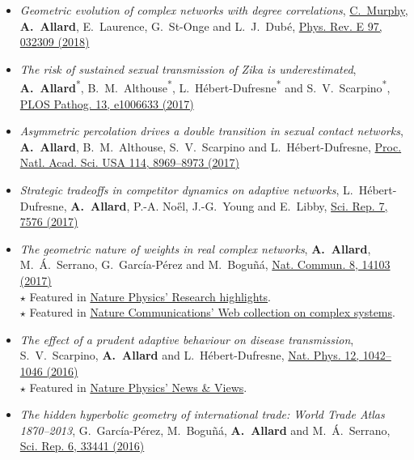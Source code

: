 \documentclass[11pt]{article}
\begin{document}
\begin{itemize}[itemsep=0.5em]
%
  \item \textit{Geometric evolution of complex networks with degree correlations}, \uline{C.~Murphy}, \textbf{A.~Allard}, E.~Laurence, G.~St-Onge and L.~J.~Dub\'e, \href{http://doi.org/10.1103/PhysRevE.97.032309}{Phys. Rev. E 97, 032309 (2018)}
%
  \item \textit{The risk of sustained sexual transmission of Zika is underestimated}, \textbf{A.~Allard}\textsuperscript{*}, B.~M.~Althouse\textsuperscript{*}, L.~H\'ebert-Dufresne\textsuperscript{*} and S.~V.~Scarpino\textsuperscript{*}, \href{http://dx.doi.org/10.1371/journal.ppat.1006633}{PLOS Pathog. 13, e1006633 (2017)}
%
  \item \textit{Asymmetric percolation drives a double transition in sexual contact networks}, \textbf{A.~Allard}, B.~M.~Althouse, S.~V.~Scarpino and L.~H\'ebert-Dufresne, \href{http://dx.doi.org/10.1073/pnas.1703073114}{Proc. Natl. Acad. Sci. USA 114, 8969--8973 (2017)}
%
  \item \textit{Strategic tradeoffs in competitor dynamics on adaptive networks}, L.~H\'ebert-Dufresne, \textbf{A.~Allard}, P.-A. No\H{e}l, J.-G.~Young and E.~Libby, \href{http://dx.doi.org/10.1038/s41598-017-07621-x}{Sci. Rep. 7, 7576 (2017)}
%
  \item \textit{The geometric nature of weights in real complex networks}, \textbf{A.~Allard}, M.~\'A.~Serrano, G.~Garc\'ia-P\'erez and M.~Bogu\~n\'a, \href{http://doi.org/10.1038/ncomms14103}{Nat. Commun. 8, 14103 (2017)}\\
  {\footnotesize $\star$ Featured in \href{http://dx.doi.org/10.1038/nphys4046}{Nature Physics' Research highlights}.}\\
  {\footnotesize $\star$ Featured in \href{https://www.nature.com/collections/ycjylwzvmz/}{Nature Communications' Web collection on complex systems}.}
%
  \item \textit{The effect of a prudent adaptive behaviour on disease transmission}, S.~V.~Scarpino, \textbf{A.~Allard} and L.~H\'ebert-Dufresne, \href{http://dx.doi.org/10.1038/nphys3832}{Nat. Phys. 12, 1042--1046 (2016)}\\
  {\footnotesize $\star$ Featured in \href{http://dx.doi.org/10.1038/nphys3939}{Nature Physics' News \& Views}.}%
%
  \item \textit{The hidden hyperbolic geometry of international trade: World Trade Atlas 1870--2013}, G.~Garc\'ia-P\'erez, M.~Bogu\~n\'a, \textbf{A.~Allard} and M.~\'A.~Serrano, \href{http://dx.doi.org/10.1038/srep33441}{Sci. Rep. 6, 33441 (2016)}

\end{itemize}
\end{document}
